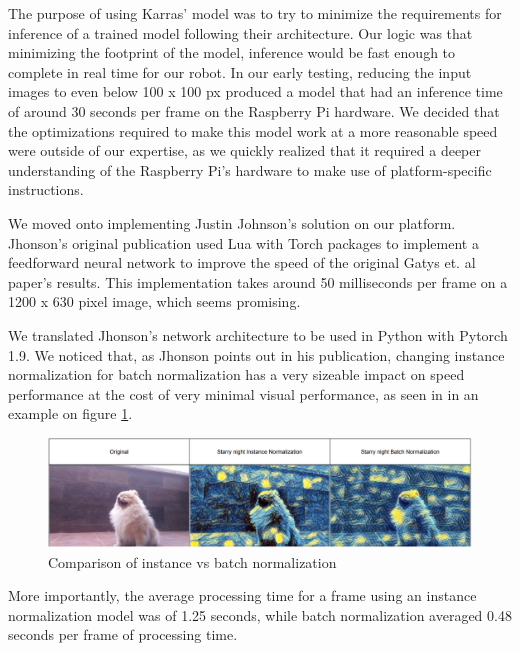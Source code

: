 The purpose of using Karras' model was to try to minimize the requirements for inference of a trained model following their architecture. Our logic was that minimizing the footprint of the model, inference would be fast enough to complete in real time for our robot. In our early testing, reducing the input images to even below 100 x 100 px produced a model that had an inference time of around 30 seconds per frame on the Raspberry Pi hardware. We decided that the optimizations required to make this model work at a more reasonable speed were outside of our expertise, as we quickly realized that it required a deeper understanding of the Raspberry Pi's hardware to make use of platform-specific instructions. 

We moved onto implementing Justin Johnson's solution on our platform. Jhonson's original publication used Lua with Torch packages to implement a feedforward neural network to improve the speed of the original Gatys et. al paper's results. This implementation takes around 50 milliseconds per frame on a 1200 x 630 pixel image, which seems promising. 

We translated Jhonson's network architecture to be used in Python with Pytorch 1.9. We noticed that, as Jhonson points out in his publication, changing instance normalization for batch normalization has a very sizeable impact on speed performance at the cost of very minimal visual performance, as seen in in an example on figure \ref{fig:norm_comp}. 


\begin{figure}[h]
    \centering
        \includegraphics[width=\textwidth]{resources/style_norm_comp.png}        
        \caption{Comparison of instance vs batch normalization}
        \label{fig:norm_comp}
\end{figure}

More importantly, the average processing time for a frame using an instance normalization model was of 1.25 seconds, while batch normalization averaged 0.48 seconds per frame of processing time. 


